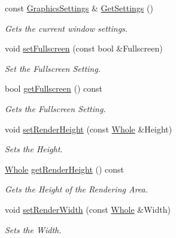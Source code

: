\begin{DoxyCompactItemize}
const \hyperlink{structphys_1_1GraphicsSettings}{GraphicsSettings} \& \hyperlink{classphys_1_1GameWindow_a9f74d3e37c8ad83727c050175927bdc1}{GetSettings} ()
\begin{DoxyCompactList}\small\item\em Gets the current window settings. \item\end{DoxyCompactList}\item 
void \hyperlink{classphys_1_1GameWindow_a3c710c93a4fca54b5249de09bd4335dc}{setFullscreen} (const bool \&Fullscreen)
\begin{DoxyCompactList}\small\item\em Set the Fullscreen Setting. \item\end{DoxyCompactList}\item 
bool \hyperlink{classphys_1_1GameWindow_a05ab7d5525e73f5eecf1f6ef6d3598ab}{getFullscreen} () const 
\begin{DoxyCompactList}\small\item\em Gets the Fullscreen Setting. \item\end{DoxyCompactList}\item 
void \hyperlink{classphys_1_1GameWindow_a92e705ba782ff87dacd9ce487141fcab}{setRenderHeight} (const \hyperlink{namespacephys_a460f6bc24c8dd347b05e0366ae34f34a}{Whole} \&Height)
\begin{DoxyCompactList}\small\item\em Sets the Height. \item\end{DoxyCompactList}\item 
\hyperlink{namespacephys_a460f6bc24c8dd347b05e0366ae34f34a}{Whole} \hyperlink{classphys_1_1GameWindow_a9c4d207a8889453ac5f35e7925fd13ef}{getRenderHeight} () const 
\begin{DoxyCompactList}\small\item\em Gets the Height of the Rendering Area. \item\end{DoxyCompactList}\item 
void \hyperlink{classphys_1_1GameWindow_a4a6087112f5a958d153fc74bc03897ba}{setRenderWidth} (const \hyperlink{namespacephys_a460f6bc24c8dd347b05e0366ae34f34a}{Whole} \&Width)
\begin{DoxyCompactList}\small\item\em Sets the Width. \item\end{DoxyCompactList}\item 

\end{DoxyCompactItemize}
